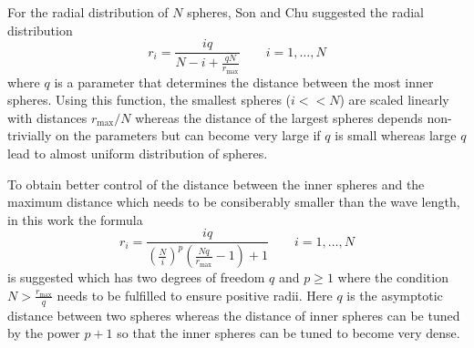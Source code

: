 For the radial distribution of $N$ spheres, Son and Chu \cite{Son_Chu0} suggested the radial distribution
\begin{equation} \label{eq:son_map}
r_i=\frac{iq}{N-i+\frac{qN}{r_\text{max}}} \qquad i=1,\hdots ,N 
\end{equation}
where $q$ is a parameter that determines the distance between the most inner spheres.
Using this function, the smallest spheres ($i<<N$) are scaled linearly with distances $r_\text{max}/N$ whereas the distance of the largest spheres depends non-trivially on the parameters but can become very large if $q$ is small whereas large $q$ lead to almost uniform distribution of spheres.

To obtain better control of the distance between the inner spheres and the maximum distance which needs to be consiberably smaller than the wave length, in this work the formula
\begin{equation} \label{eq:tm_map}
r_i=\frac{iq}{\left( \frac Ni \right)^p \left(\frac{Nq}{r_\text{max}}-1\right) +1} \qquad i=1,\hdots ,N 
\end{equation}
is suggested which has two degrees of freedom $q$ and $p\geq 1$ where the condition $N>\frac{r_\text{max}}{q}$ needs to be fulfilled to ensure positive radii.
Here $q$ is the asymptotic distance between two spheres whereas the distance of inner spheres can be tuned by the power $p+1$ so that the inner spheres can be tuned to become very dense.

